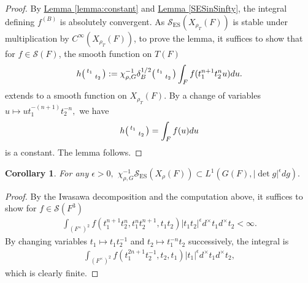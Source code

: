 \documentclass[10pt]{amsart}
\newtheorem{corollary}{Corollary}[theorem]
\theoremstyle{definition}
\numberwithin{equation}{section}
\numberwithin{equation}{subsection}
\newenvironment{psmatrix}
  {\left(\begin{smallmatrix}}
  {\end{smallmatrix}\right)}
\begin{document}
\begin{proof}
By \hyperref[lemma:constant]{Lemma \ref{lemma:constant}} and \hyperref[SESinSinfty]{Lemma \ref{SESinSinfty}}, the integral defining $f^{(B)}$ is absolutely convergent. As $\mathcal{S}_{\mathrm{ES}}(X_{\rho_T}(F))$ is stable under multiplication by $C^\infty(X_{\rho_T}(F))$, to prove the lemma, it suffices to show that for $f\in \mathcal{S}(F)$, the smooth function on $T(F)$
\begin{align*}
   h\begin{psmatrix}
       t_1\\
       & t_2
   \end{psmatrix}:=\chi_{\rho,G}^{-1}\delta_{B}^{1/2}\begin{psmatrix}
       t_1& \\
        & t_2
   \end{psmatrix}\int_{F}f(t_1^{n+1}t_2^nu) du.
\end{align*}
extends to a smooth function on $X_{\rho_T}(F).$ By a change of variables $u\mapsto ut_1^{-(n+1)}t_2^{-n},$ we have
\begin{align*}
    h\begin{psmatrix}
       t_1\\
       & t_2
   \end{psmatrix}=\int_{F}f(u) du
\end{align*}
is a constant. The lemma follows.
\end{proof}

\begin{corollary}
    For any $\epsilon>0,$ $\chi_{\rho,G}^{-1}\mathcal{S}_{\mathrm{ES}}(X_\rho(F))\subset L^1(G(F),|\det g|^{\epsilon}dg).$
\end{corollary}

\begin{proof}
    By the Iwasawa decomposition and the computation above, it suffices to show for $f\in \mathcal{S}(F^3)$
\begin{align*}
    \int_{(F^\times)^2} f(t_1^{n+1}t_2^n,t_1^n t_2^{n+1},t_1t_2)|t_1t_2|^{\epsilon}d^\times t_1d^\times t_2<\infty.
\end{align*}
By changing variables $t_1\mapsto t_1t_2^{-1}$ and  $t_2\mapsto t_1^{-n}t_2$ successively, the integral is
\begin{align*}
    \int_{(F^\times)^2} f(t_1^{2n+1}t_2^{-1},t_2, t_1) |t_1|^{\epsilon} d^\times t_1d^\times t_2,
\end{align*}
which is clearly finite.
\end{proof}
\end{document}
